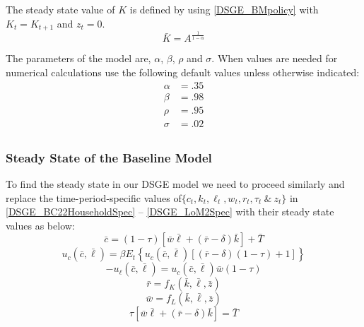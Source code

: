 \documentclass[letterpaper,12pt]{article}
\theoremstyle{definition}
\begin{document}
\begin{spacing}{1.5}
			The steady state value of $K$ is defined by using \eqref{DSGE_BMpolicy} with $K_t=K_{t+1}$ and $z_t=0$.
			\begin{equation}\label{DSGE_BMSSK}
			\bar K = A ^\frac{1}{1-\alpha}
			\end{equation}

			The parameters of the model are, $\alpha$, $\beta$, $\rho$ and $\sigma$.  When values are needed for numerical calculations use the following default values unless otherwise indicated:
			\begin{equation}\label{parameters}
			\begin{split}
			\alpha & = .35 \\
			\beta & = .98 \\
			\rho & = .95 \\
			\sigma & = .02 \\ \nonumber
			\end{split}
			\end{equation}

		\subsubsection{Steady State of the Baseline Model}\label{DSGE_SS_Base}
			To find the steady state in our DSGE model we need to proceed similarly and replace the time-period-specific values of$\{c_t,k_t,\ell_t,w_t,r_t,\tau_t\>\&\>z_t\}$ in \eqref{DSGE_BC22HouseholdSpec} -- \eqref{DSGE_LoM2Spec} with their steady state values as below:
			\begin{equation}\label{DSGE_BC23HouseholdSpec}
			\bar c = (1-\tau) \left[\bar w \bar \ell+(\bar r-\delta)\bar k\right] + \bar T
			\end{equation}
			\begin{equation}\label{DSGE_Euler23HouseholdDSGE}
			u_c(\bar c,\bar \ell) = \beta E_t\left\{ u_c(\bar c,\bar \ell)[(\bar r-\delta)(1-\tau)+1] \right\}
			\end{equation}
			\begin{equation}\label{DSGE_EulerB3HouseholdSpec}
			-u_{\ell}(\bar c,\bar \ell) = u_{c}(\bar c,\bar \ell)\bar w(1-\tau)
			\end{equation}
			\begin{equation}\label{DSGE_FOC013FirmSpec}
			\bar r = f_K(\bar k,\bar \ell,\bar z)
			\end{equation}
			\begin{equation}\label{DSGE_FOC023FirmSpec}
			\bar w = f_L(\bar k,\bar \ell,\bar z)
			\end{equation}
			\begin{equation}\label{DSGE_GovtBC3FirmSpec}
			\tau \left[\bar w \bar \ell+(\bar r-\delta)\bar k\right] = \bar T
			\end{equation}


\end{spacing}
\end{document}
